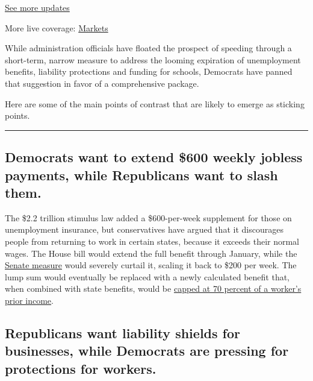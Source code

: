 \href{https://www.nytimes.com/2020/08/04/world/coronavirus-cases.html?action=click\&pgtype=Article\&state=default\&region=MAIN_CONTENT_1\&context=storylines_live_updates}{See
more updates}

More live coverage:
\href{https://www.nytimes.com/live/2020/08/04/business/stock-market-today-coronavirus?action=click\&pgtype=Article\&state=default\&region=MAIN_CONTENT_1\&context=storylines_live_updates}{Markets}

While administration officials have floated the prospect of speeding
through a short-term, narrow measure to address the looming expiration
of unemployment benefits, liability protections and funding for schools,
Democrats have panned that suggestion in favor of a comprehensive
package.

Here are some of the main points of contrast that are likely to emerge
as sticking points.

\begin{center}\rule{0.5\linewidth}{\linethickness}\end{center}

\hypertarget{democrats-want-to-extend-600-weekly-jobless-payments-while-republicans-want-to-slash-them}{%
\subsection{Democrats want to extend \$600 weekly jobless payments,
while Republicans want to slash
them.}\label{democrats-want-to-extend-600-weekly-jobless-payments-while-republicans-want-to-slash-them}}

The \$2.2 trillion stimulus law added a \$600-per-week supplement for
those on unemployment insurance, but conservatives have argued that it
discourages people from returning to work in certain states, because it
exceeds their normal wages. The House bill would extend the full benefit
through January, while the
\href{https://www.nytimes.com/2020/06/24/us/politics/senate-police-bill.html}{Senate
measure} would severely curtail it, scaling it back to \$200 per week.
The lump sum would eventually be replaced with a newly calculated
benefit that, when combined with state benefits, would be
\href{https://www.nytimes.com/2020/07/23/business/economy/unemployment-benefits.html}{capped
at 70 percent of a worker's prior income}.

\hypertarget{republicans-want-liability-shields-for-businesses-while-democrats-are-pressing-for-protections-for-workers}{%
\subsection{Republicans want liability shields for businesses, while
Democrats are pressing for protections for
workers.}\label{republicans-want-liability-shields-for-businesses-while-democrats-are-pressing-for-protections-for-workers}}

